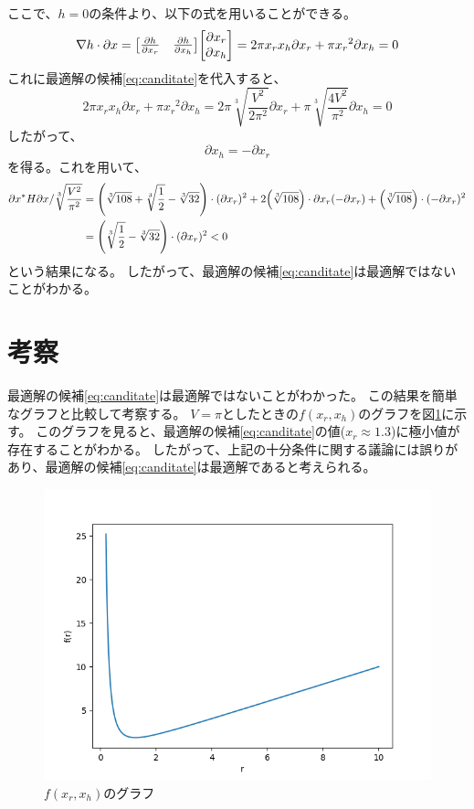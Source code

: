 \documentclass{jsarticle}
\begin{document}
ここで、$h=0$の条件より、以下の式を用いることができる。
\begin{equation}
  \nabla h \cdot \partial x = \mqty[\pdv{h}{{x_r}} & \pdv{h}{{x_h}}] \mqty[\partial{{x_r}} \\ \partial{{x_h}}] = 
  2\pi {x_r} {x_h} \partial{{x_r}} + \pi {x_r}^2 \partial{{x_h}} = 0
\end{equation}
これに最適解の候補\eqref{eq:canditate}を代入すると、
\begin{equation}
  2\pi {x_r} {x_h} \partial{{x_r}} + \pi {x_r}^2 \partial{{x_h}} 
  = 2\pi \sqrt[3]{\frac{V^2}{2\pi^2}} \partial{{x_r}} + \pi \sqrt[3]{\frac{4V^2}{\pi^2}} \partial{{x_h}}
  = 0
\end{equation}
したがって、
\begin{equation}
  \partial{{x_h}} = -\partial{{x_r}}
\end{equation}
を得る。これを用いて、
\begin{align}
  \partial{x}^*H\partial{x}
  / \sqrt[3]{\frac{V^2}{\pi^2}}
  &=
  \qty(\sqrt[3]{108} + \sqrt[3]{\frac{1}{2}} - \sqrt[3]{32}) \cdot (\partial{{x_r}})^2
  + 2\qty(\sqrt[3]{108}) \cdot \partial{{x_r}}(-\partial{{x_r}})
  + \qty(\sqrt[3]{108}) \cdot (-\partial{{x_r}})^2 \\
  &=\qty(\sqrt[3]{\frac{1}{2}} - \sqrt[3]{32}) \cdot (\partial{{x_r}})^2 
  < 0
\end{align}
という結果になる。
したがって、最適解の候補\eqref{eq:canditate}は最適解ではないことがわかる。

\section{考察}
最適解の候補\eqref{eq:canditate}は最適解ではないことがわかった。
この結果を簡単なグラフと比較して考察する。
$V=\pi$としたときの$f({x_r}, {x_h})$のグラフを図\ref{fig:f}に示す。
このグラフを見ると、最適解の候補\eqref{eq:canditate}の値($x_r\approx 1.3$)に極小値が存在することがわかる。
したがって、上記の十分条件に関する議論には誤りがあり、最適解の候補\eqref{eq:canditate}は最適解であると考えられる。
\begin{figure}[b]
  \centering
  \includegraphics[width=\textwidth]{./graph/graph.png}
  \caption{$f({x_r}, {x_h})$のグラフ}
  \label{fig:f}
\end{figure}
\end{document}
